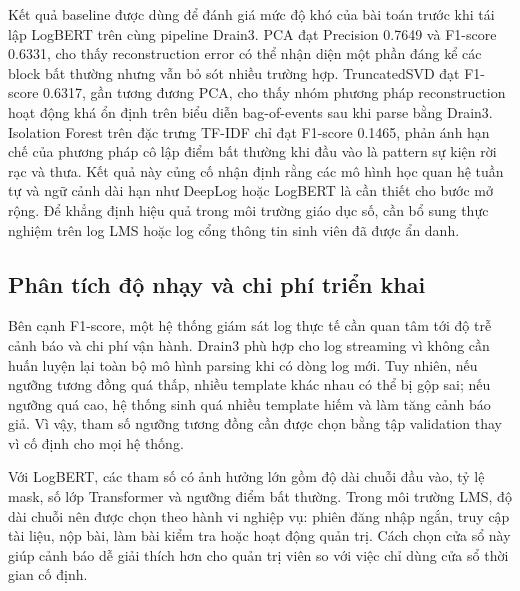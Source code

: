 \documentclass[conference]{IEEEtran}
\begin{document}
Kết quả baseline được dùng để đánh giá mức độ khó của bài toán trước khi tái lập LogBERT trên cùng pipeline Drain3. PCA đạt Precision 0.7649 và F1-score 0.6331, cho thấy reconstruction error có thể nhận diện một phần đáng kể các block bất thường nhưng vẫn bỏ sót nhiều trường hợp. TruncatedSVD đạt F1-score 0.6317, gần tương đương PCA, cho thấy nhóm phương pháp reconstruction hoạt động khá ổn định trên biểu diễn bag-of-events sau khi parse bằng Drain3. Isolation Forest trên đặc trưng TF-IDF chỉ đạt F1-score 0.1465, phản ánh hạn chế của phương pháp cô lập điểm bất thường khi đầu vào là pattern sự kiện rời rạc và thưa. Kết quả này củng cố nhận định rằng các mô hình học quan hệ tuần tự và ngữ cảnh dài hạn như DeepLog hoặc LogBERT là cần thiết cho bước mở rộng. Để khẳng định hiệu quả trong môi trường giáo dục số, cần bổ sung thực nghiệm trên log LMS hoặc log cổng thông tin sinh viên đã được ẩn danh.

\subsection{Phân tích độ nhạy và chi phí triển khai}
Bên cạnh F1-score, một hệ thống giám sát log thực tế cần quan tâm tới độ trễ cảnh báo và chi phí vận hành. Drain3 phù hợp cho log streaming vì không cần huấn luyện lại toàn bộ mô hình parsing khi có dòng log mới. Tuy nhiên, nếu ngưỡng tương đồng quá thấp, nhiều template khác nhau có thể bị gộp sai; nếu ngưỡng quá cao, hệ thống sinh quá nhiều template hiếm và làm tăng cảnh báo giả. Vì vậy, tham số ngưỡng tương đồng cần được chọn bằng tập validation thay vì cố định cho mọi hệ thống.

Với LogBERT, các tham số có ảnh hưởng lớn gồm độ dài chuỗi đầu vào, tỷ lệ mask, số lớp Transformer và ngưỡng điểm bất thường. Trong môi trường LMS, độ dài chuỗi nên được chọn theo hành vi nghiệp vụ: phiên đăng nhập ngắn, truy cập tài liệu, nộp bài, làm bài kiểm tra hoặc hoạt động quản trị. Cách chọn cửa sổ này giúp cảnh báo dễ giải thích hơn cho quản trị viên so với việc chỉ dùng cửa sổ thời gian cố định.
\end{document}
